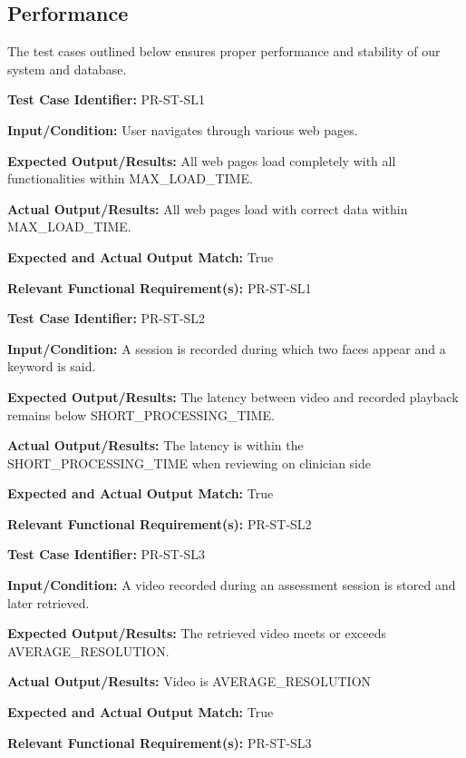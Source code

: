 \documentclass[12pt, titlepage]{article}
\begin{document}
\subsection{Performance}
\hspace{2em}The test cases outlined below ensures proper performance and stability of our system and database.
\begin{mdframed}[linewidth=0.5mm]
  \textbf{Test Case Identifier:} PR-ST-SL1 \par
  \textbf{Input/Condition:} User navigates through various web pages. \par
  \textbf{Expected Output/Results:} All web pages load completely with all functionalities within MAX\_LOAD\_TIME. \par
  \textbf{Actual Output/Results:} All web pages load with correct data within MAX\_LOAD\_TIME. \par
  \textbf{Expected and Actual Output Match:} True \par
  \textbf{Relevant Functional Requirement(s):} PR-ST-SL1
\end{mdframed}

\begin{mdframed}[linewidth=0.5mm]
  \textbf{Test Case Identifier:} PR-ST-SL2 \par
  \textbf{Input/Condition:} A session is recorded during which two faces appear and a keyword is said. \par
  \textbf{Expected Output/Results:} The latency between video and recorded playback remains below SHORT\_PROCESSING\_TIME. \par
  \textbf{Actual Output/Results:} The latency is within the \\SHORT\_PROCESSING\_TIME when reviewing on clinician side \par
  \textbf{Expected and Actual Output Match:} True \par
  \textbf{Relevant Functional Requirement(s):} PR-ST-SL2
\end{mdframed}

\begin{mdframed}[linewidth=0.5mm]
  \textbf{Test Case Identifier:} PR-ST-SL3 \par
  \textbf{Input/Condition:} A video recorded during an assessment session is stored and later retrieved. \par
  \textbf{Expected Output/Results:} The retrieved video meets or exceeds AVERAGE\_RESOLUTION. \par
  \textbf{Actual Output/Results:} Video is AVERAGE\_RESOLUTION\par
  \textbf{Expected and Actual Output Match:} True \par
  \textbf{Relevant Functional Requirement(s):} PR-ST-SL3
\end{mdframed}
\end{document}
